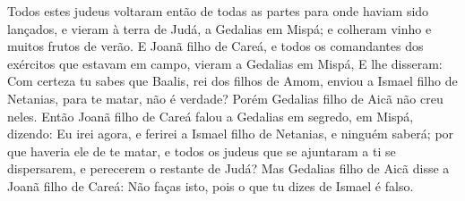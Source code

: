 {Todos estes judeus voltaram então de todas as partes para onde haviam sido lançados, e vieram à terra de Judá, a Gedalias em Mispá; e colheram vinho e muitos frutos de verão.
E Joanã filho de Careá, e todos os comandantes dos exércitos que estavam em campo, vieram a Gedalias em Mispá,
E lhe disseram: Com certeza tu sabes que Baalis, rei dos filhos de Amom, enviou a Ismael filho de Netanias, para te matar, não é verdade? Porém Gedalias filho de Aicã não creu neles.
Então Joanã filho de Careá falou a Gedalias em segredo, em Mispá, dizendo: Eu irei agora, e ferirei a Ismael filho de Netanias, e ninguém saberá; por que haveria ele de te matar, e todos os judeus que se ajuntaram a ti se dispersarem, e perecerem o restante de Judá?
Mas Gedalias filho de Aicã disse a Joanã filho de Careá: Não faças isto, pois o que tu dizes de Ismael é falso.

\par }

